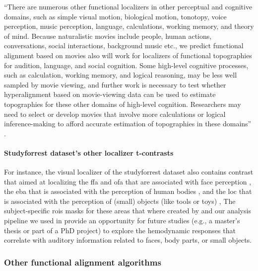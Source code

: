 %
``There are numerous other functional localizers in other perceptual and
cognitive domains, such as simple visual motion, biological motion, tonotopy,
voice perception, music perception, language, calculations, working memory, and
theory of mind.
%
Because naturalistic movies include people, human actions, conversations, social
interactions, background music etc., we predict functional alignment based on
movies also will work for localizers of functional topographies for audition,
language, and social cognition.
%
Some high-level cognitive processes, such as calculation, working memory, and
logical reasoning, may be less well sampled by movie viewing, and further work
is necessary to test whether hyperalignment based on movie-viewing data can be
used to estimate topographies for these other domains of high-level cognition.
%
Researchers may need to select or develop movies that involve more calculations
or logical inference-making to afford accurate estimation of topographies in
these domains'' \citep{jiahui2020predicting}.


\paragraph{Studyforrest dataset's other localizer t-contrasts}


For instance, the visual localizer of the studyforrest dataset also contains
contrast that aimed at localizing the \ac{ffa} and \ac{ofa} that are associated
with face perception \citep{kanwisher1997ffa, pitcher2011occipitalfacearea}, the
\ac{eba} that is associated with the perception of human bodies
\citep{downing2001bodyarea}, and the \ac{loc} that is associated with the
perception of (small) objects (like tools or toys) \citep{malach1995loc},
%
The subject-specific \acp{roi} masks for these areas that where created by
\citep{sengupta2016extension} and our analysis pipeline we used in
\citet{haeusler2022processing} provide an opportunity for future studies (e.g.,
a master's thesis or part of a PhD project) to explore the hemodynamic responses
that correlate with auditory information related to faces, body parts, or small
objects.



\subsubsection{Other functional alignment algorithms}

